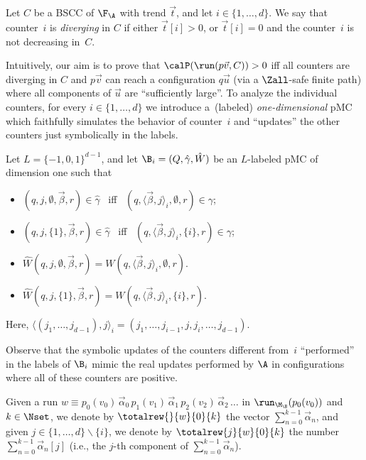 \begin{definition}
  Let $C$ be a BSCC of $\F_{\A}$ with trend $\vec{t}$, and let 
  $i \in \{1,\ldots,d\}$. We say that counter~$i$ is \emph{diverging}
  in $C$ if either $\vec{t}[i] > 0$, or $\vec{t}[i] = 0$ and the counter~$i$ 
  is not decreasing in~$C$.
\end{definition}
Intuitively, our aim is to prove that $\calP(\run(p\vec{v},C))>0$ iff
all counters are diverging in $C$ and $p\vec{v}$ can reach a configuration 
$q\vec{u}$ (via a $\Zall$-safe finite path) where all components of 
$\vec{u}$ are ``sufficiently large''.
To analyze the individual counters, for every $i \in \{1,\ldots,d\}$
we introduce a~(labeled) \emph{one-dimensional} pMC
which faithfully simulates the behavior of counter~$i$
and ``updates'' the other counters just symbolically in the labels.

\begin{definition} 
  Let $L = \{-1,0,1\}^{d-1}$, and let $\B_i = (Q,\hat{\gamma},\hat{W})$
  be an $L$-labeled pMC of dimension one such that 
  \begin{itemize}\itemsep1ex
  \item $(q,j,\emptyset,\vec{\beta},r) \in \hat{\gamma}$ \ iff \ 
        $(q,\langle \vec{\beta},j\rangle_i,\emptyset,r) \in \gamma$;
  \item $(q,j,\{1\},\vec{\beta},r) \in \hat{\gamma}$ \ iff \ 
        $(q,\langle \vec{\beta},j\rangle_i,\{i\},r) \in \gamma$;
  \item $\hat{W}(q,j,\emptyset,\vec{\beta},r) = 
         W(q,\langle \vec{\beta},j \rangle_i,\emptyset,r)$.
  \item $\hat{W}(q,j,\{1\},\vec{\beta},r) = 
         W(q,\langle \vec{\beta},j \rangle_i,\{i\},r)$.
  \end{itemize}
  Here, 
  $\langle (j_1,\ldots,j_{d-1}),j\rangle_i = 
   (j_1,\ldots,j_{i-1},j,j_i,\ldots,j_{d-1})$.
\end{definition}

\noindent
Observe that the symbolic updates of the counters different from~$i$ 
``performed'' in the labels of $\B_i$ mimic the real updates performed
by $\A$ in configurations where all of these counters are
positive. 

Given a run $w\equiv p_0(v_0) \, \vec{\alpha}_0 \, 
p_1(v_1) \, \vec{\alpha}_1 \, p_2(v_2) \, \vec{\alpha}_2 \, \ldots$ in $\run_{\M_{\B}}(p_0(v_0))$ and $k\in \Nset$, we denote by $\totalrew{}{w}{0}{k}$ the vector $\sum_{n=0}^{k-1} \vec{\alpha}_n$, and given $j\in \{1,\ldots,d\}\smallsetminus \{i\}$, we denote by $\totalrew{j}{w}{0}{k}$ the number $\sum_{n=0}^{k-1} \vec{\alpha}_n[j]$ (i.e., the $j$-th component of $\sum_{n=0}^{k-1} \vec{\alpha}_n$).

